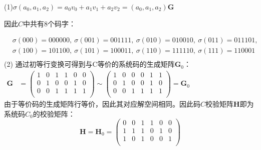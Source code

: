 \begin{Solution}
    (1)$\sigma(a_0,a_1,a_2) = a_0v_0 + a_1v_1 + a_2v_2 = (a_0,a_1,a_2)\bm{G}$
    
    因此$C$中共有$8$个码字：

    $
    \begin{aligned}
        &\sigma(000) = 000000,~
        \sigma(001) = 001111,~
        \sigma(010) = 010010,~
        \sigma(011) = 011101,\\
        &\sigma(100) = 101100,~
        \sigma(101) = 100011,~
        \sigma(110) = 111110,~
        \sigma(111) = 110001\\
    \end{aligned}
    $\\

    (2) 通过初等行变换可得到与C等价的系统码的生成矩阵$\bm{G}_0$：\\

    $
    \begin{aligned}
        \bm{G} &= \left(
        \begin{matrix}
            1 &0 &1 &1 &0 &0\\
            0 &1 &0 &0 &1 &0\\
            0 &0 &1 &1 &1 &1\\
        \end{matrix}
    \right)
    \sim
    \left(
        \begin{matrix}
            1 &0 &0 &0 &1 &1\\
            0 &1 &0 &0 &1 &0\\
            0 &0 &1 &1 &1 &1\\
        \end{matrix}
    \right)
    = \bm{G}_0
    \end{aligned}
    $\\

    由于等价码的生成矩阵行等价，因此其对应解空间相同。因此码$C$校验矩阵$\bm{H}$即为系统码$C_0$的校验矩阵：
    \begin{equation}
        \bm{H} = \bm{H}_0=
        \left(
            \begin{matrix}
                0 &0 &1 &1 &0 &0\\
                1 &1 &1 &0 &1 &0\\
                1 &0 &1 &0 &0 &1\\
            \end{matrix}
        \right)
    \end{equation}

\end{Solution}

